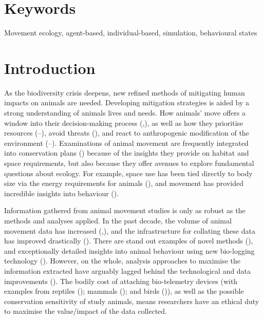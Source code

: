\documentclass[10pt,a4paper]{article}
\begin{document}
\section*{\color{f1ROrange}Keywords}

Movement ecology, agent-based, individual-based, simulation, behavioural states

\clearpage
\pagestyle{fancy}

\section{Introduction}\label{main}

As the biodiversity crisis deepens, new refined methods of mitigating human impacts on animals are needed.
Developing mitigation strategies is aided by a strong understanding of animals lives and needs.
How animals' move offers a window into their decision-making process (,), as well as how they prioritise resources (--), avoid threats (), and react to anthropogenic modification of the environment (--).
Examinations of animal movement are frequently integrated into conservation plans () because of the insights they provide on habitat and space requirements, but also because they offer avenues to explore fundamental questions about ecology.
For example, space use has been tied directly to body size via the energy requirements for animals (), and movement has provided incredible insights into behaviour ().

Information gathered from animal movement studies is only as robust as the methods and analyses applied.
In the past decade, the volume of animal movement data has increased (,), and the infrastructure for collating these data has improved drastically ().
There are stand out examples of novel methods (), and exceptionally detailed insights into animal behaviour using new bio-logging technology ().
However, on the whole, analysis approaches to maximise the information extracted have arguably lagged behind the technological and data improvements ().
The bodily cost of attaching bio-telemetry devices (with examples from reptiles (); mammals (); and birds ()), as well as the possible conservation sensitivity of study animals, means researchers have an ethical duty to maximise the value/impact of the data collected.
\end{document}

